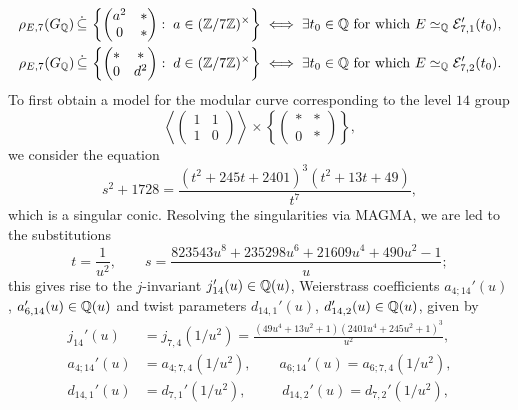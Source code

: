 \begin{equation} \label{relevantlevel7twists}
\begin{split}
\rho_{E,7}(G_{\mathbb{Q}}) \, \dot\subseteq \, \left\{ \begin{pmatrix} a^2 & * \\ 0 & * \end{pmatrix} : \; a \in (\mathbb{Z}/7\mathbb{Z})^\times \right\} \; &\Longleftrightarrow \; \exists t_0 \in \mathbb{Q} \text{ for which } E \simeq_{\mathbb{Q}} \mathcal{E}_{7,1}'(t_0), \\
\rho_{E,7}(G_{\mathbb{Q}}) \, \dot\subseteq \, \left\{ \begin{pmatrix} * & * \\ 0 & d^2 \end{pmatrix} : \; d \in (\mathbb{Z}/7\mathbb{Z})^\times \right\} \; &\Longleftrightarrow \; \exists t_0 \in \mathbb{Q} \text{ for which } E \simeq_{\mathbb{Q}} \mathcal{E}_{7,2}'(t_0).
\end{split}
\end{equation}
To first obtain a model for the modular curve corresponding to the level $14$ group 
\[
\left\langle \begin{pmatrix} 1 & 1 \\ 1 & 0 \end{pmatrix} \right\rangle \times \left\{ \begin{pmatrix} * & * \\ 0 & * \end{pmatrix} \right\}, 
\]
we consider the equation
\begin{equation} \label{sexpressionequaltotexpression}
s^2 + 1728 = \frac{(t^2 + 245t + 2401)^3(t^2 + 13t + 49)}{t^7},
\end{equation}
which is a singular conic. Resolving the singularities via MAGMA, we are led to the substitutions 
\begin{equation} \label{sandtintermsofu}
t = \frac{1}{u^2}, \quad\quad s = \frac{823543u^8 + 235298u^6 + 21609u^4 + 490u^2 - 1}{u}; 
\end{equation}
this gives rise to the $j$-invariant $j_{14}'(u) \in \mathbb{Q}(u)$, Weierstrass coefficients $a_{4;14}'(u)$, $a_{6,14}'(u) \in \mathbb{Q}(u)$ and twist parameters $d_{14,1}'(u)$, $d_{14,2}'(u) \in \mathbb{Q}(u)$, given by
\begin{equation} \label{jinvariantsandWeierstrasscoefficientslevel14}
\begin{split}
j_{14}'(u) &= j_{7,4}(1/u^2) = \frac{(49u^4 + 13u^2 + 1)(2401u^4 + 245u^2 + 1)^3}{u^2}, \\
a_{4;14}'(u) &= a_{4;7,4}(1/u^2), \quad\quad a_{6;14}'(u) = a_{6;7,4}(1/u^2), \\
d_{14,1}'(u) &= d_{7,1}'(1/u^2), \quad\quad\;\; d_{14,2}'(u) = d_{7,2}'(1/u^2),
\end{split}
\end{equation}
